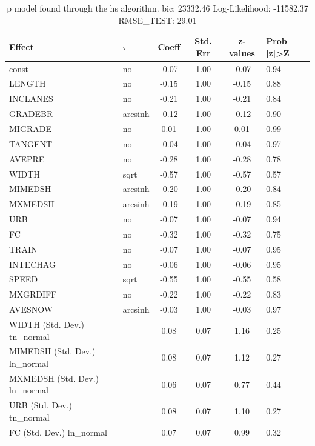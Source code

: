 \begin{table}
	\caption{p model found through the hs algorithm. bic: 23332.46 Log-Likelihood: -11582.37 RMSE_TEST: 29.01}
	\begin{center}
		\begin{tabular}{|l|l|c|c|c|l|}
			\hline
			Effect & $\tau$ & Coeff & Std. Err & z-values & Prob |z|>Z \\
			\hline
			const & no & -0.07 & 1.00 & -0.07 & 0.94 \\
			\hline
			LENGTH & no & -0.15 & 1.00 & -0.15 & 0.88 \\
			\hline
			INCLANES & no & -0.21 & 1.00 & -0.21 & 0.84 \\
			\hline
			GRADEBR & arcsinh & -0.12 & 1.00 & -0.12 & 0.90 \\
			\hline
			MIGRADE & no & 0.01 & 1.00 & 0.01 & 0.99 \\
			\hline
			TANGENT & no & -0.04 & 1.00 & -0.04 & 0.97 \\
			\hline
			AVEPRE & no & -0.28 & 1.00 & -0.28 & 0.78 \\
			\hline
			WIDTH & sqrt & -0.57 & 1.00 & -0.57 & 0.57 \\
			\hline
			MIMEDSH & arcsinh & -0.20 & 1.00 & -0.20 & 0.84 \\
			\hline
			MXMEDSH & arcsinh & -0.19 & 1.00 & -0.19 & 0.85 \\
			\hline
			URB & no & -0.07 & 1.00 & -0.07 & 0.94 \\
			\hline
			FC & no & -0.32 & 1.00 & -0.32 & 0.75 \\
			\hline
			TRAIN & no & -0.07 & 1.00 & -0.07 & 0.95 \\
			\hline
			INTECHAG & no & -0.06 & 1.00 & -0.06 & 0.95 \\
			\hline
			SPEED & sqrt & -0.55 & 1.00 & -0.55 & 0.58 \\
			\hline
			MXGRDIFF & no & -0.22 & 1.00 & -0.22 & 0.83 \\
			\hline
			AVESNOW & arcsinh & -0.03 & 1.00 & -0.03 & 0.97 \\
			\hline
			WIDTH (Std. Dev.) tn_normal &  & 0.08 & 0.07 & 1.16 & 0.25 \\
			\hline
			MIMEDSH (Std. Dev.) ln_normal &  & 0.08 & 0.07 & 1.12 & 0.27 \\
			\hline
			MXMEDSH (Std. Dev.) ln_normal &  & 0.06 & 0.07 & 0.77 & 0.44 \\
			\hline
			URB (Std. Dev.) tn_normal &  & 0.08 & 0.07 & 1.10 & 0.27 \\
			\hline
			FC (Std. Dev.) ln_normal &  & 0.07 & 0.07 & 0.99 & 0.32 \\

\end{tabular}
\end{center}
\end{table}
